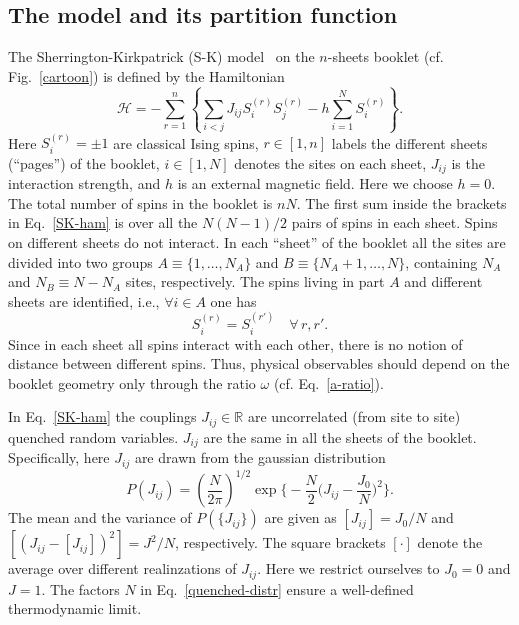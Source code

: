 \documentclass[twocolumn,superscriptaddress,prb,10pt]{revtex4-1}
\begin{document}
\subsection{The model and its partition function}
\label{the-model-def}

The Sherrington-Kirkpatrick (S-K) model~\cite{sherrington-1978-prl,
sherrington-1978} on the $n$-sheets booklet (cf. Fig.~\ref{cartoon}) is 
defined by the Hamiltonian
%
\begin{equation}
{\mathcal H}=-\sum\limits_{r=1}^n\left\{\sum\limits_{i<j}J_{ij}S^{(r)}_i 
S^{(r)}_j-h\sum\limits_{i=1}^NS^{(r)}_i\right\}.
\label{SK-ham}
\end{equation}
%
Here $S_i^{(r)}=\pm 1$ are classical Ising spins, $r\in[1,n]$ labels the 
different sheets (``pages'') of the booklet, $i\in[1,N]$ denotes the sites on 
each sheet, $J_{ij}$ is the interaction strength, and $h$ is an external 
magnetic field. Here we choose $h=0$. The total number of spins in the booklet 
is $nN$. The first sum inside the brackets in Eq.~\eqref{SK-ham} is over all the 
$N(N-1)/2$ pairs of spins in each sheet. Spins on different sheets do not interact. 
In each ``sheet'' of the booklet all the sites are divided into two groups $A\equiv\{1,
\dots, N_A\}$ and $B\equiv\{N_A+1,\dots,N\}$, containing $N_A$ and $N_B\equiv N-N_A$ 
sites, respectively. The spins living in part $A$ and different sheets are identified, 
i.e., $\forall i\in A$ one has  
%
\begin{equation}
S_i^{(r)}=S_{i}^{(r')}\quad\forall\, r,r'. 
\label{book-constraint}
\end{equation}
%
Since in each sheet all spins interact with each other, there is no notion of distance 
between different spins. Thus, physical observables should depend on the booklet geometry 
only through the ratio $\omega$ (cf. Eq.~\eqref{a-ratio}). 

In Eq.~\eqref{SK-ham} the couplings $J_{ij}\in\mathbb{R}$ are uncorrelated (from site to site) 
quenched random variables. $J_{ij}$ are the same in all the sheets of the booklet. Specifically, 
here $J_{ij}$ are drawn from the gaussian distribution   
%
\begin{equation}
P(J_{ij})=
\left(\frac{N}{2\pi}\right)^{1/2}
\exp\Big\{-\frac{N}{2}
\Big(J_{ij}-\frac{J_0}{N}\Big)^2\Big\}.
\label{quenched-distr}
\end{equation}
%
The mean and the variance of $P(\{J_{ij}\})$ are given as $[J_{ij}]=J_0/N$ 
and $[(J_{ij}-[J_{ij}])^2]=J^2/N$, respectively. The square brackets $[\cdot]$ denote 
the average over different realinzations of $J_{ij}$.  Here we restrict ourselves to 
$J_0=0$ and $J=1$. The factors $N$ in Eq.~\eqref{quenched-distr} ensure a well-defined 
thermodynamic limit. 
\end{document}
